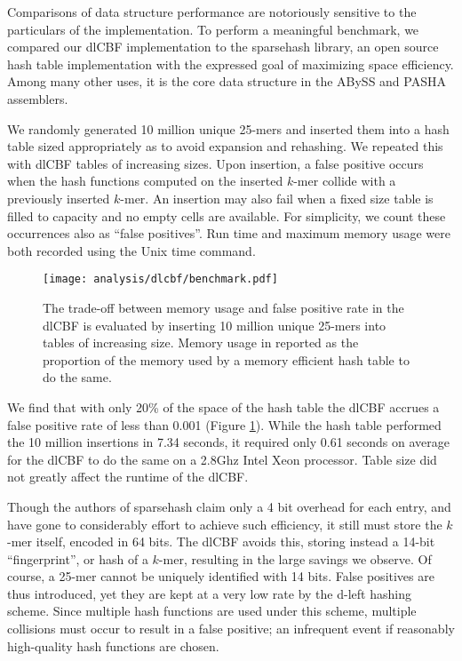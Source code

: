 \documentclass[twocolumn]{article}
\begin{document}
Comparisons of data structure performance are notoriously sensitive to the
particulars of the implementation. To perform a meaningful benchmark, we
compared our dlCBF implementation to the sparsehash library, an open source
hash table implementation with the expressed goal of maximizing space
efficiency. Among many other uses, it is the core data structure in the ABySS
\citep{Simpson2011} and PASHA \citep{Liu2011} assemblers.

We randomly generated 10 million unique 25-mers and inserted them into a hash
table sized appropriately as to avoid expansion and rehashing. We repeated
this with dlCBF tables of increasing sizes. Upon insertion, a false positive
occurs when the hash functions computed on the inserted $k$-mer collide with a
previously inserted $k$-mer. An insertion may also fail when a fixed size
table is filled to capacity and no empty cells are available. For simplicity,
we count these occurrences also as ``false positives''. Run time and maximum memory
usage were both recorded using the Unix time command.

\begin{figure}[h]
\centerline{\texttt{[image: analysis/dlcbf/benchmark.pdf]}}
\caption{
The trade-off between memory usage and false positive rate in the dlCBF is
evaluated by inserting 10 million unique 25-mers into tables of increasing
size. Memory usage in reported as the proportion of the memory used by a
memory efficient hash table to do the same.
}
\label{fig:dlcbf_bench}
\end{figure}

We find that with only 20\% of the space of the hash table the dlCBF accrues a
false positive rate of less than 0.001 (Figure \ref{fig:dlcbf_bench}). While
the hash table performed the 10 million insertions in 7.34 seconds, it
required only 0.61 seconds on average for the dlCBF to do the same on a 2.8Ghz
Intel Xeon processor. Table size did not greatly affect the runtime of the
dlCBF.

Though the authors of sparsehash claim only a 4 bit overhead for each entry,
and have gone to considerably effort to achieve such efficiency, it still must
store the $k$-mer itself, encoded in 64 bits. The dlCBF avoids this, storing
instead a 14-bit ``fingerprint'', or hash of a $k$-mer, resulting in the large
savings we observe. Of course, a 25-mer cannot be uniquely identified with 14
bits. False positives are thus introduced, yet they are kept at a very low
rate by the d-left hashing scheme. Since multiple hash functions are used
under this scheme, multiple collisions must occur to result in a false
positive; an infrequent event if reasonably high-quality hash functions are
chosen.
\end{document}
